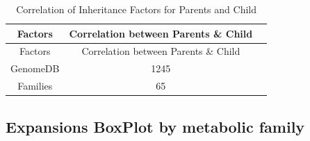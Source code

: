 \documentclass[12pt,twoside]{reedthesis}
\begin{document}
  \begin{longtable}[c]{@{}ccl@{}}
  \caption{Correlation of Inheritance Factors for Parents and Child
  \label{tab:inher}}\tabularnewline
  \toprule
  \begin{minipage}[b]{0.29\columnwidth}\centering\strut
  Factors
  \strut\end{minipage} &
  \begin{minipage}[b]{0.47\columnwidth}\centering\strut
  Correlation between Parents \& Child
  \strut\end{minipage} &
  \begin{minipage}[b]{0.16\columnwidth}\raggedright\strut
  \strut\end{minipage}\tabularnewline
  \midrule
  \endfirsthead
  \toprule
  \begin{minipage}[b]{0.29\columnwidth}\centering\strut
  Factors
  \strut\end{minipage} &
  \begin{minipage}[b]{0.47\columnwidth}\centering\strut
  Correlation between Parents \& Child
  \strut\end{minipage} &
  \begin{minipage}[b]{0.16\columnwidth}\raggedright\strut
  \strut\end{minipage}\tabularnewline
  \midrule
  \endhead
  \begin{minipage}[t]{0.29\columnwidth}\centering\strut
  GenomeDB
  \strut\end{minipage} &
  \begin{minipage}[t]{0.47\columnwidth}\centering\strut
  1245
  \strut\end{minipage} &
  \begin{minipage}[t]{0.16\columnwidth}\raggedright\strut
  \strut\end{minipage}\tabularnewline
  \begin{minipage}[t]{0.29\columnwidth}\centering\strut
  Families
  \strut\end{minipage} &
  \begin{minipage}[t]{0.47\columnwidth}\centering\strut
  65
  \strut\end{minipage} &
  \begin{minipage}[t]{0.16\columnwidth}\raggedright\strut
  \strut\end{minipage}\tabularnewline
  \bottomrule
  \end{longtable}
  
  \clearpage
  
  \subsection{Expansions BoxPlot by metabolic
  family}\label{expansions-boxplot-by-metabolic-family-1}
  
\end{document}
